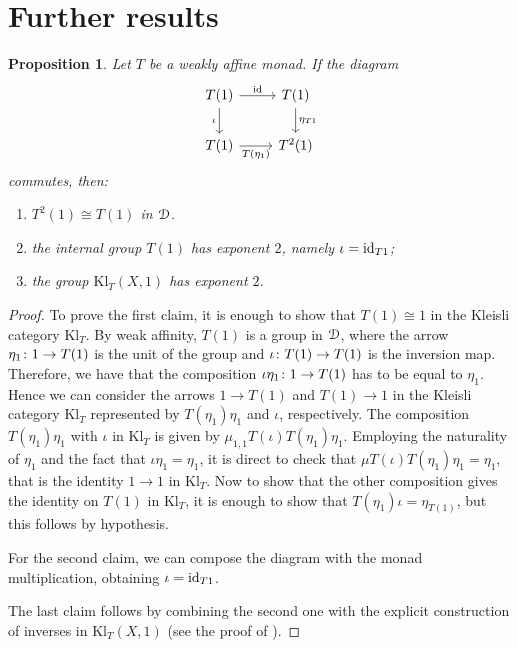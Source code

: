 \documentclass[a4paper,UKenglish,numberwithinsect,cleveref, autoref, thm-restate]{lipics-v2021}
\theoremstyle{plain} %
\newtheorem{myproposition}[mytheorem]{Proposition}
\theoremstyle{definition} %
\begin{document}
\section{Further results}


\begin{myproposition}
Let $T$ be a weakly affine monad. If the diagram
\[\begin{tikzcd}
	{T(1)} & {T(1)} \\
	{T(1)} & {T^2(1)}
	\arrow["\iota"', from=1-1, to=2-1]
	\arrow["{T(\eta_1)}"', from=2-1, to=2-2]
	\arrow["\id",from=1-1, to=1-2]
	\arrow["{\eta_{T1}}", from=1-2, to=2-2]
\end{tikzcd}\]
commutes, then:
\begin{enumerate}
	\item $T^2(1)\cong T(1)$ in $\mD$. 
	\item the internal group $T(1)$ has exponent $2$, namely $\iota=\id_{T1}$;
	\item the group $\mathrm{Kl}_T(X,1)$ has exponent $2$.
\end{enumerate}
\end{myproposition}


\begin{proof}
	To prove the first claim, it is enough to show that $T(1)\cong 1$ in the Kleisli category $\mathrm{Kl}_T$.
	By weak affinity, $T(1)$ is a group in $\mD$, where the arrow $\freccia{1}{\eta_1}{T(1)}$ is the unit of the group and $\freccia{T(1)}{\iota}{T(1)}$ is the inversion map. Therefore, we have that the composition $\freccia{1}{\iota\eta_1}{T(1)}$ has to be equal to $\eta_1$.
	Hence we can consider the arrows $1\to T(1)$ and $T(1)\to 1$ in the Kleisli category $\mathrm{Kl}_T$ represented by $T(\eta_1)\eta_1$ and $\iota$, respectively. The composition $T(\eta_1)\eta_1$ with $\iota$ in $\mathrm{Kl}_T$ is given by $\mu_{1,1}T(\iota)T(\eta_1)\eta_1$. Employing the naturality of $\eta_1$ and the fact that $\iota\eta_1=\eta_1$, it is direct to check that $\mu T(\iota)T(\eta_1)\eta_1=\eta_1$, that is the identity $1\to 1$ in $\mathrm{Kl}_T$. Now to show that the other composition gives the identity on $T(1)$ in $\mathrm{Kl}_T$, it is enough to show that $T(\eta_1)\iota=\eta_{T(1)}$, but this follows by hypothesis.

	For the second claim, we can compose the diagram with the monad multiplication, obtaining $\iota=\id_{T1}$.
	
	The last claim follows by combining the second one with the explicit construction of inverses in $\mathrm{Kl}_T(X,1)$ (see the proof of ).
\end{proof}
\end{document}
